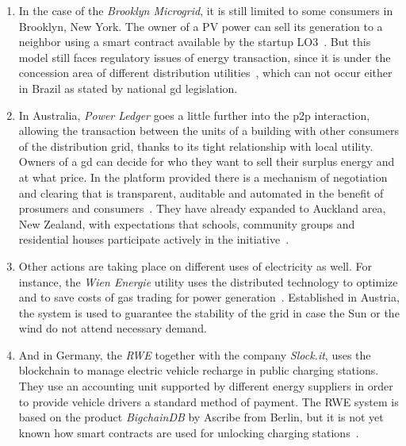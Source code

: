 \begin{enumerate}[label={\textcolor{gray}{(\arabic*)}}, font={\small\bfseries}]
    \item\label{brook} In the case of the \emph{Brooklyn Microgrid}, it is still limited to some consumers in Brooklyn, New York.
    The owner of a PV power can sell its generation to a neighbor using a smart contract available by the startup LO3~\cite{blocktrading}. %
    But this model still faces regulatory issues of energy transaction, since it is under the concession area of different distribution utilities~\cite{mangelkamp2017}, which can not occur either in Brazil as stated by national \gls{gd} legislation.

    \item\label{pwr} In Australia, \emph{Power Ledger} goes a little further into the \gls{p2p} interaction, allowing the transaction between the units of a building with other consumers of the distribution grid, thanks to its tight relationship with local utility.
    Owners of a \gls{gd} can decide for who they want to sell their surplus energy and at what price.
    In the platform provided there is a mechanism of negotiation and clearing that is transparent, auditable and automated in the benefit of prosumers and consumers~\cite{pwrledger}.
    They have already expanded to Auckland area, New Zealand, with expectations that schools, community groups and residential houses participate actively in the initiative~\cite{groarke2016}.
    
    \item\label{wien} Other actions are taking place on different uses of electricity as well.
    For instance, the \emph{Wien Energie} utility uses the distributed technology to optimize and to save costs of gas trading for power generation~\cite{groarke2016}.
    Established in Austria, the system is used to guarantee the stability of the grid in case the Sun or the wind do not attend necessary demand\cite{wien-energie2016}.
    
    \item\label{rwe} And in Germany, the \emph{RWE} together with the company \emph{Slock.it}, uses the blockchain to manage electric vehicle recharge in public charging stations.
    They use an accounting unit supported by different energy suppliers in order to provide vehicle drivers a standard method of payment.
    The RWE system is based on the product \emph{BigchainDB} by Ascribe from Berlin, but it is not yet known how smart contracts are used for unlocking charging stations~\cite{blocktrading}.
    

\end{enumerate}
